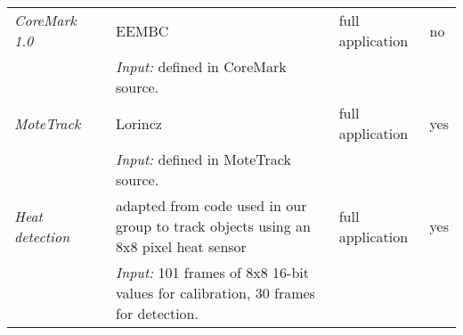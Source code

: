 \begin{table}[h]
\begin{tabular}{llp{}ll}
\emph{CoreMark 1.0}      &                                          & EEMBC \cite{coremark}                                                                                      & full application & no \\
                         &                                          & \emph{Input:} defined in CoreMark source.                                                                  &                  & \\

\emph{MoteTrack}         &                                          & Lorincz \cite{Lorincz:2006fc, motetrack}                                                                   & full application & yes \\
                         &                                          & \emph{Input:} defined in MoteTrack source.                                                                 &                  & \\

\emph{Heat detection}    &                                          & adapted from code used in our group to track objects using an 8x8 pixel heat sensor                        & full application & yes \\
                         &                                          & \emph{Input:} 101 frames of 8x8 16-bit values for calibration, 30 frames for detection.                    &                  & \\

\bottomrule
\end{tabular}  
\end{table}


